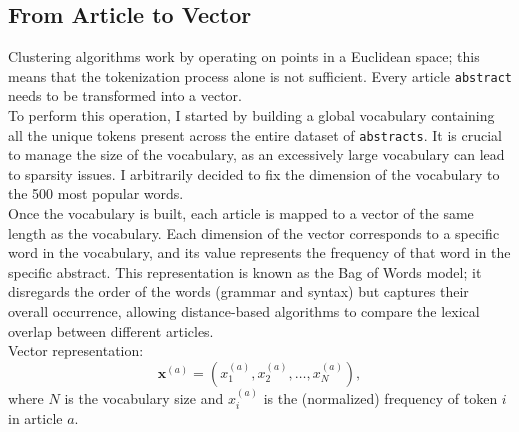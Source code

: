 \documentclass{report}
\begin{document}
\subsection{From Article to Vector}
Clustering algorithms work by operating on points in a Euclidean space; this means that the tokenization process alone is not sufficient. Every article \verb|abstract| needs to be transformed into a vector.
\\
To perform this operation, I started by building a global vocabulary containing all the unique tokens present across the entire dataset of \verb|abstracts|. It is crucial to manage the size of the vocabulary, as an excessively large vocabulary can lead to sparsity issues. I arbitrarily decided to fix the dimension of the vocabulary to the 500 most popular words.
\\
Once the vocabulary is built, each article is mapped to a vector of the same length as the vocabulary. Each dimension of the vector corresponds to a specific word in the vocabulary, and its value represents the frequency of that word in the specific abstract. This representation is known as the Bag of Words model; it disregards the order of the words (grammar and syntax) but captures their overall occurrence, allowing distance-based algorithms to compare the lexical overlap between different articles.
\\
Vector representation:
\\
\[
\mathbf{x}^{(a)} = \left(x^{(a)}_1, x^{(a)}_2, \dots, x^{(a)}_N\right),
\]
where \(N\) is the vocabulary size and \(x^{(a)}_i\) is the (normalized) frequency of token \(i\) in article \(a\).
\end{document}
